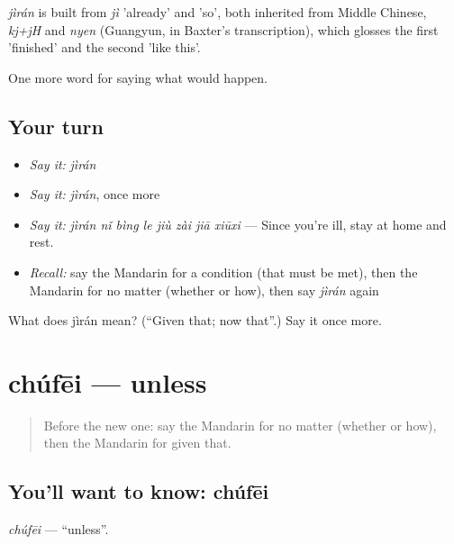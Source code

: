 \begin{cousinweb}
\emph{jìrán} is built from \emph{jì} 'already' and  'so', both inherited from Middle Chinese, \emph{kj+jH} and \emph{nyen} (Guangyun, in Baxter's transcription), which glosses the first 'finished' and the second 'like this'.
\end{cousinweb}

\begin{grammarlens}[title={What you've built}]
One more word for saying what would happen.
\end{grammarlens}

\subsection*{Your turn}
\begin{itemize}
\raggedright
  \item \emph{Say it:} \emph{jìrán}
  \item \emph{Say it:} \emph{jìrán}, once more
  \item \emph{Say it:} \emph{jìrán nǐ bìng le jiù zài jiā xiūxi} — Since you're ill, stay at home and rest.
  \item \emph{Recall:} say the Mandarin for a condition (that must be met), then the Mandarin for no matter (whether or how), then say \emph{jìrán} again
\end{itemize}

\begin{tcolorbox}[breakable,colback=teal!4,colframe=teal!35!black,title={Before you move on}]
What does jìrán mean? (\textquotedblleft{}Given that; now that\textquotedblright{}.) Say it once more.
\end{tcolorbox}
\section[chúfēi]{chúfēi — unless}

\label{lesson:ZH-C396-chufei}



\begin{quote}
Before the new one: say the Mandarin for no matter (whether or how), then the Mandarin for given that.
\end{quote}

\subsection*{You'll want to know: chúfēi}
\emph{chúfēi} — \textquotedblleft{}unless\textquotedblright{}.

